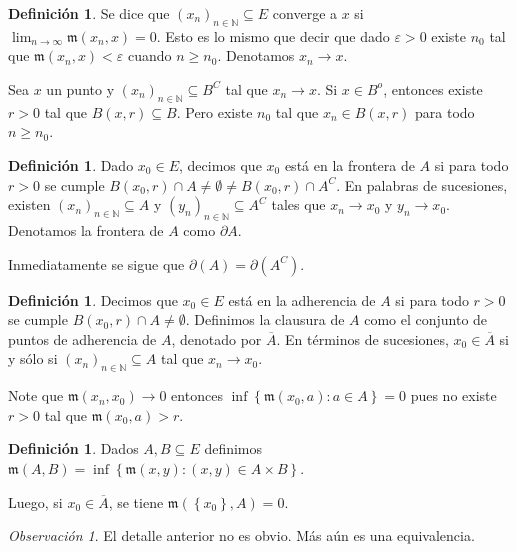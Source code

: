 \documentclass[12pt]{article}
\theoremstyle{plain}
\theoremstyle{definition}
\newtheorem{Def}[Th]{Definición}       %
\theoremstyle{remark}
\newtheorem{Rmk}[Th]{Observación}      %
\numberwithin{equation}{section}
\newcommand{\bN}{\mathbb{N}}        %
\newcommand{\mm}{\mathfrak{m}}      %
\renewcommand{\geq}{\geqslant}      %
\renewcommand{\:}{\colon}           %
\newcommand{\conj}[1]{\left\lbrace#1\right\rbrace}
\begin{document}
\begin{multicols}{2}
\begin{Def}
  Se dice que $(x_n)_{n\in\bN}\subseteq E$ converge a $x$ si $\lim_{n\to\infty}\mm(x_n,x)=0$. Esto es lo mismo que decir que dado $\varepsilon >0$ existe $n_0$ tal que $\mm(x_n,x)<\varepsilon$ cuando $n\geq n_0$. Denotamos $x_n\to x$.
\end{Def}

Sea $x$ un punto y $(x_n)_{n\in\bN}\subseteq B^C$ tal que $x_n\to x$. Si $x\in B^o$, entonces existe $r>0$ tal que $B(x,r)\subseteq B$. Pero existe $n_0$ tal que $x_n\in B(x,r)$ para todo $n\geq n_0$.

\begin{Def}
  Dado $x_0\in E$, decimos que $x_0$ está en la frontera de $A$ si para todo $r>0$ se cumple $B(x_0,r)\cap A \neq \emptyset \neq B(x_0,r)\cap A^C$. En palabras de sucesiones, existen $(x_n)_{n\in\bN}\subseteq A$ y $(y_n)_{n\in\bN}\subseteq A^C$ tales que $x_n\to x_0$ y $y_n\to x_0$. Denotamos la frontera de $A$ como $\partial A$.
\end{Def}

Inmediatamente se sigue que $\partial(A) = \partial(A^C)$.

\begin{Def}
  Decimos que $x_0\in E$ está en la adherencia de $A$ si para todo $r>0$ se cumple $B(x_0,r)\cap A \neq \emptyset$. Definimos la clausura de $A$ como el conjunto de puntos de adherencia de $A$, denotado por $\overline{A}$. En términos de sucesiones, $x_0\in\overline{A}$ si y sólo si $(x_n)_{n\in\bN}\subseteq A$ tal que $x_n\to x_0$.
\end{Def}

Note que $\mm(x_n,x_0)\to 0$ entonces $\inf\conj{\mm(x_0,a)\colon a\in A}=0$ pues no existe $r>0$ tal que $\mm(x_0,a)> r$.

\begin{Def}
  Dados $A,B\subseteq E$ definimos $\mm(A,B) = \inf\conj{\mm(x,y)\colon (x,y)\in A\times B}$.
\end{Def}

Luego, si $x_0\in\overline{A}$, se tiene $\mm(\conj{x_0},A)=0$.

\begin{Rmk}\label{distCeroClausura}
  El detalle anterior no es obvio. Más aún es una equivalencia.
\end{Rmk}


\end{multicols}
\end{document}
